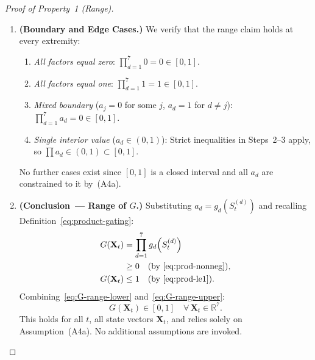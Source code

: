 \documentclass[12pt,openany]{book}
\numberwithin{equation}{chapter}
\theoremstyle{plain}
\theoremstyle{definition}
\theoremstyle{remark}
\def\mathcal#1{#1}%
\begin{document}
\begin{proof}[Proof of Property~1 (Range)]
\begin{enumerate}
  \item \textbf{(Boundary and Edge Cases.)}
        We verify that the range claim holds at every
        extremity:
        \begin{enumerate}
          \item \emph{All factors equal zero}:
                $\prod_{d=1}^{7} 0 = 0 \in [0,1]$. \checkmark
          \item \emph{All factors equal one}:
                $\prod_{d=1}^{7} 1 = 1 \in [0,1]$. \checkmark
          \item \emph{Mixed boundary} ($a_j = 0$ for some $j$,
                $a_d = 1$ for $d \neq j$):
                $\prod_{d=1}^{7} a_d = 0 \in [0,1]$. \checkmark
          \item \emph{Single interior value} ($a_d \in (0,1)$):
                Strict inequalities in Steps~2--3 apply,
                so $\prod a_d \in (0,1) \subset [0,1]$.
                \checkmark
        \end{enumerate}
        No further cases exist since $[0,1]$ is a closed
        interval and all $a_d$ are constrained to it by~(A4a).

  \item \textbf{(Conclusion~--- Range of $G$.)}
        Substituting $a_d =
          g_d\!\left(\mathcal{S}_t^{(d)}\right)$
        and recalling Definition~\eqref{eq:product-gating}:
        \begin{align}
          G(\mathbf{X}_t)
            &= \prod_{d=1}^{7}
               g_d\!\left(\mathcal{S}_t^{(d)}\right)
            \label{eq:G-range-expand} \\
            &\geq 0
            \label{eq:G-range-lower}
              \quad\text{(by~\eqref{eq:prod-nonneg})}, \\
          G(\mathbf{X}_t)
            &\leq 1
            \label{eq:G-range-upper}
              \quad\text{(by~\eqref{eq:prod-le1})}.
        \end{align}
        Combining~\eqref{eq:G-range-lower}
        and~\eqref{eq:G-range-upper}:
        \begin{equation}
          G(\mathbf{X}_t) \in [0,1]
          \quad \forall\, \mathbf{X}_t \in \mathbb{R}^{7}.
          \label{eq:G-range-final}
        \end{equation}
        This holds for all $t$, all state vectors
        $\mathbf{X}_t$, and relies solely on Assumption~(A4a).
        No additional assumptions are invoked.
\end{enumerate}


\end{proof}
\end{document}
